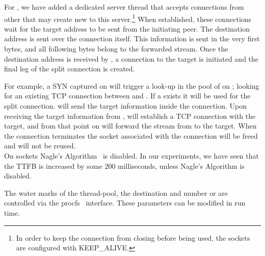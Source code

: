For \reconns, we have added a dedicated server thread that accepts connections from other \relays that may create new \reconns to this server.\footnote{In order to keep the connection from closing before being used, the sockets are configured with KEEP\_ALIVE.}
When established, these connections wait for the target address to be sent from the initiating peer. The destination address is sent over the connection itself. This information is sent in the very first bytes, and all following bytes belong to the forwarded stream. 
Once the destination address is received by \rs , a connection to the target is initiated and the final leg of the split connection is created.

For example, a SYN captured on \rc will trigger a look-up in the pool of \reconns on \rc; looking for an existing TCP connection between \rc and \rs. If a \reconn exists it will be used for the split connection. \rc will send the target information inside the connection. Upon receiving the target information from \rc, \rs will establish a TCP connection with the target, and from that point on \rs will forward the stream from \rc to the target. When the connection terminates the socket associated with the connection will be freed and will not be reused.\\ 
 On \reconn sockets Nagle's Algorithm~\cite{nagle} is disabled. In our experiments, we have seen that the TTFB is increased by some $200$ milliseconds, unless Nagle's Algorithm is disabled.  

 The water marks of the thread-pool, the destination and number or \reconn are controlled via the procfs~\cite{proc} interface. These parameters can be modified in run time.


